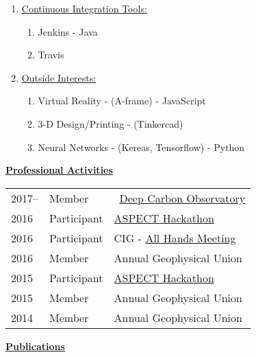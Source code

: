 \documentclass[11pt]{ltxdoc}
\begin{document}
\begin{enumerate}
  \item \underline{Continuous Integration Tools:}
    \begin{enumerate}
      \item Jenkins - Java
      \item Travis
    \end{enumerate}
  \item \underline{Outside Interests:}
    \begin{enumerate}
      \item Virtual Reality - (A-frame) - JavaScript
      \item 3-D Design/Printing - (Tinkercad)
      \item Neural Networks - (Kereas, Tensorflow) - Python
    \end{enumerate}
\end{enumerate}


\vskip 12pt

\begin{center}
	\textbf{\underline{Professional Activities}}
\end{center}

\vskip -06pt

\addtolength{\tabcolsep}{15pt}   
\begin{tabular}{lll}
  2017--     & Member & ~\href{https://deepcarbon.net/}{Deep Carbon Observatory} \\
  2016     & Participant & \href{https://geodynamics.org/cig/events/calendar/2017-aspect-hack/}{ASPECT Hackathon} \\
  2016     & Participant & CIG - \href{https://geodynamics.org/cig/events/calendar/2016-cig-all-hands-meeting/}{All Hands Meeting} \\
  2016     & Member & Annual Geophysical Union \\
  2015     & Participant & \href{https://geodynamics.org/cig/events/calendar/2016-cig-all-hands-meeting/2016-aspect-hack/?eID=1233}{ASPECT Hackathon}\\
  2015     & Member & Annual Geophysical Union \\
  2014     & Member & Annual Geophysical Union 
\end{tabular}
\addtolength{\tabcolsep}{1pt}  
 
\clearpage

\newpage

\begin{center}
  \textbf{\underline{Publications}}
\end{center}
\end{document}
